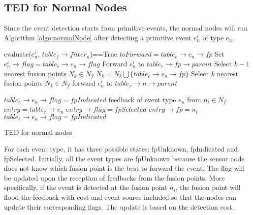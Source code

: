 \subsection{TED for Normal Nodes}
Since the event detection starts from primitive events, the normal nodes will run Algorithm \ref{algo:normalNode} after detecting a primitive event \(e^i_n\) of type \(e_n\).
\begin{algorithm}
\begin{algorithmic}
\REQUIRE evaluate(\(e^i_n\), \(table_f\rightarrow filter_n\))==True
		\STATE \(toForward=table_e\rightarrow e_n\rightarrow fp\)
		\STATE Set \(e^i_n\rightarrow flag=table_e\rightarrow e_n\rightarrow flag\)
		\STATE Forward \(e^i_n\) to \(table_r\rightarrow fp\rightarrow parent\)
	\ELSE
			\STATE Select \(k-1\) nearest fusion points \(N_k\in N_f\)
			\STATE \(N_k=N_k\bigcup \{table_e\rightarrow e_n\rightarrow fp\}\)
		\ELSE
			\STATE Select \(k\) nearest fusion points \(N_k\in N_f\)
		\ENDIF
			\STATE forward \(e^i_n\) to \(table_r\rightarrow n\rightarrow parent\)
		\ENDFOR
	\ENDIF
	
		\STATE \(table_e\rightarrow e_n\rightarrow flag=fpIndicated\)
	\ENDIF
\REQUIRE feedback of event type \(e_n\) from \(n_i\in N_f\)
	\STATE \(entry=table_e\rightarrow e_n\)
		\STATE \(entry\rightarrow flag=fpSelected\)
		\STATE \(entry\rightarrow fp=n_i\)
		\STATE \(table_e\rightarrow e_n\rightarrow flag=fpIndicated\)
	\ENDIF
\end{algorithmic}
\caption{TED for normal nodes}
\label{algo:normalNode}
\end{algorithm}
For each event type, it has three possible states: fpUnknown, fpIndicated and fpSelected. Initially, all the event types are fpUnknown because the sensor node does not know which fusion point is the best to forward the event. The flag will be updated upon the reception of feedbacks from the fusion points. More specifically, if the event is detected at the fusion point \(n_i\), the fusion point will flood the feedback with cost and event source included so that the nodes can update their corresponding flags. The update is based on the detection cost.

